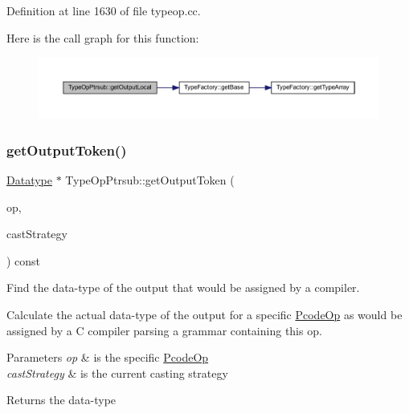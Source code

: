 Definition at line 1630 of file typeop.\+cc.

Here is the call graph for this function\+:
\nopagebreak
\begin{figure}[H]
\begin{center}
\leavevmode
\includegraphics[width=350pt]{class_type_op_ptrsub_ada6371e868ebf8d0f5aae1ba70a60e36_cgraph}
\end{center}
\end{figure}
\mbox{\label{class_type_op_ptrsub_a1830a4ee48307559c378c4147aa19979}} 
\subsubsection{\texorpdfstring{getOutputToken()}{getOutputToken()}}
{\footnotesize\ttfamily \mbox{\hyperlink{class_datatype}{Datatype}} $\ast$ Type\+Op\+Ptrsub\+::get\+Output\+Token (\begin{DoxyParamCaption}\item[{const \mbox{\hyperlink{class_pcode_op}{Pcode\+Op}} $\ast$}]{op,  }\item[{\mbox{\hyperlink{class_cast_strategy}{Cast\+Strategy}} $\ast$}]{cast\+Strategy }\end{DoxyParamCaption}) const\hspace{0.3cm}{\ttfamily [virtual]}}



Find the data-\/type of the output that would be assigned by a compiler. 

Calculate the actual data-\/type of the output for a specific \mbox{\hyperlink{class_pcode_op}{Pcode\+Op}} as would be assigned by a C compiler parsing a grammar containing this op. 
\begin{DoxyParams}{Parameters}
{\em op} & is the specific \mbox{\hyperlink{class_pcode_op}{Pcode\+Op}} \\
\hline
{\em cast\+Strategy} & is the current casting strategy \\
\hline
\end{DoxyParams}
\begin{DoxyReturn}{Returns}
the data-\/type 
\end{DoxyReturn}


